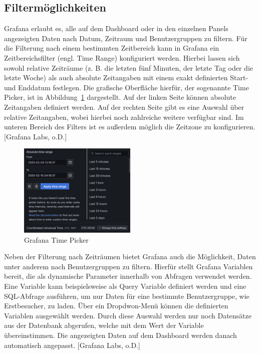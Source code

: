 \subsection{Filtermöglichkeiten}
Grafana erlaubt es, alle auf dem Dashboard oder in den einzelnen Panels angezeigten Daten nach Datum, Zeitraum und Benutzergruppen zu filtern. Für die Filterung nach einem bestimmten Zeitbereich kann in Grafana ein Zeitbereichsfilter (engl. Time Range) konfiguriert werden. Hierbei lassen sich sowohl relative Zeiträume (z. B. die letzten fünf Minuten, der letzte Tag oder die letzte Woche) als auch absolute Zeitangaben mit einem exakt definierten Start- und Enddatum festlegen. Die grafische Oberfläche hierfür, der sogenannte Time Picker, ist in Abbildung~\ref{fig:timerange} dargestellt. Auf der linken Seite können absolute Zeitangaben definiert werden. Auf der rechten Seite gibt es eine Auswahl über relative Zeitangaben, wobei hierbei noch zahlreiche weitere verfügbar sind. Im unteren Bereich des Filters ist es außerdem möglich die Zeitzone zu konfigurieren. [Grafana Labs, o.D.]

\begin{figure}[H]
    \centering
    \includegraphics[width=0.5\textwidth]{images/timerange.png}
    \caption{Grafana Time Picker}%
    \label{fig:timerange}%
\end{figure}

Neben der Filterung nach Zeiträumen bietet Grafana auch die Möglichkeit, Daten unter anderem nach Benutzergruppen zu filtern. Hierfür stellt Grafana Variablen bereit, die als dynamische Parameter innerhalb von Abfragen verwendet werden. Eine Variable kann beispielsweise als Query Variable definiert werden und eine SQL-Abfrage ausführen, um nur Daten für eine bestimmte Benutzergruppe, wie Erstbesucher, zu laden. Über ein Dropdwon-Menü können die definierten Variablen ausgewählt werden. Durch diese Auswahl werden nur noch Datensätze aus der Datenbank abgerufen, welche mit dem Wert der Variable übereinstimmen. Die angezeigten Daten auf dem Dashboard werden danach automatisch angepasst. [Grafana Labs, o.D.]

